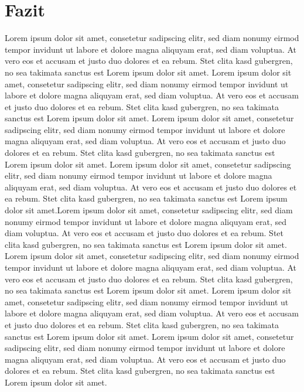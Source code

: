\documentclass[conference]{IEEEtran}
\begin{document}
\section{Fazit}
\label{Fazit}
Lorem ipsum dolor sit amet, consetetur sadipscing elitr, sed diam nonumy eirmod tempor invidunt ut labore et dolore magna aliquyam erat, sed diam voluptua. At vero eos et accusam et justo duo dolores et ea rebum. Stet clita kasd gubergren, no sea takimata sanctus est Lorem ipsum dolor sit amet. Lorem ipsum dolor sit amet, consetetur sadipscing elitr, sed diam nonumy eirmod tempor invidunt ut labore et dolore magna aliquyam erat, sed diam voluptua. At vero eos et accusam et justo duo dolores et ea rebum. Stet clita kasd gubergren, no sea takimata sanctus est Lorem ipsum dolor sit amet. Lorem ipsum dolor sit amet, consetetur sadipscing elitr, sed diam nonumy eirmod tempor invidunt ut labore et dolore magna aliquyam erat, sed diam voluptua. At vero eos et accusam et justo duo dolores et ea rebum. Stet clita kasd gubergren, no sea takimata sanctus est Lorem ipsum dolor sit amet. Lorem ipsum dolor sit amet, consetetur sadipscing elitr, sed diam nonumy eirmod tempor invidunt ut labore et dolore magna aliquyam erat, sed diam voluptua. At vero eos et accusam et justo duo dolores et ea rebum. Stet clita kasd gubergren, no sea takimata sanctus est Lorem ipsum dolor sit amet.Lorem ipsum dolor sit amet, consetetur sadipscing elitr, sed diam nonumy eirmod tempor invidunt ut labore et dolore magna aliquyam erat, sed diam voluptua. At vero eos et accusam et justo duo dolores et ea rebum. Stet clita kasd gubergren, no sea takimata sanctus est Lorem ipsum dolor sit amet. Lorem ipsum dolor sit amet, consetetur sadipscing elitr, sed diam nonumy eirmod tempor invidunt ut labore et dolore magna aliquyam erat, sed diam voluptua. At vero eos et accusam et justo duo dolores et ea rebum. Stet clita kasd gubergren, no sea takimata sanctus est Lorem ipsum dolor sit amet. Lorem ipsum dolor sit amet, consetetur sadipscing elitr, sed diam nonumy eirmod tempor invidunt ut labore et dolore magna aliquyam erat, sed diam voluptua. At vero eos et accusam et justo duo dolores et ea rebum. Stet clita kasd gubergren, no sea takimata sanctus est Lorem ipsum dolor sit amet. Lorem ipsum dolor sit amet, consetetur sadipscing elitr, sed diam nonumy eirmod tempor invidunt ut labore et dolore magna aliquyam erat, sed diam voluptua. At vero eos et accusam et justo duo dolores et ea rebum. Stet clita kasd gubergren, no sea takimata sanctus est Lorem ipsum dolor sit amet.




\listoffigures
\end{document}
